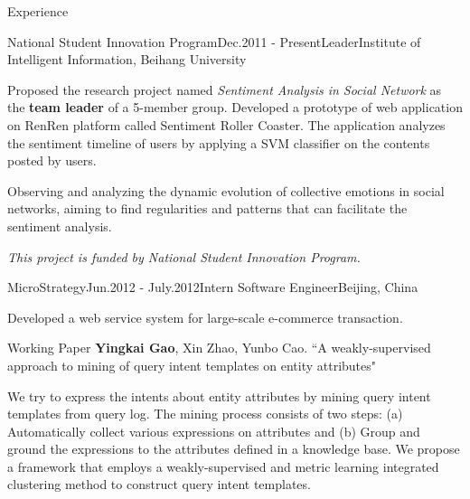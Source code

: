 \documentclass{resume} %
\begin{document}
\begin{rSection}{Experience}
\begin{rSubsection}{National Student Innovation Program}{Dec.2011 - Present}{Leader}{Institute of Intelligent Information, Beihang University}
\item Proposed the research project named \emph {Sentiment Analysis in Social Network} as the \textbf{team leader} of a 5-member group.  Developed a prototype of web application on RenRen platform called Sentiment Roller Coaster.  The application analyzes the sentiment timeline of users by applying a SVM classifier on the contents posted by users.
\item Observing and analyzing the dynamic evolution of collective emotions in social networks, aiming to find regularities and patterns that can facilitate the sentiment analysis.
\item {\em This project is funded by National Student Innovation Program.}
\end{rSubsection}


\begin{rSubsection}{MicroStrategy}{Jun.2012 - July.2012}{Intern Software Engineer}{Beijing, China}
\item Developed a web service system for large-scale e-commerce transaction.
\end{rSubsection}

\end{rSection}

\pagebreak[4]

\begin{rSection}{Working Paper}
\textbf{Yingkai Gao}, Xin Zhao, Yunbo Cao. ``A weakly-supervised approach to mining of query intent templates on entity attributes"
\begin{adjustwidth}{8pt}{0pt}
 We try to express the intents about entity attributes by mining query intent templates from query log.  The mining process consists of two steps: (a) Automatically collect various expressions on attributes and (b) Group and ground the expressions to the attributes defined in a knowledge base.  We propose a framework that employs a weakly-supervised and metric learning integrated clustering method to construct query intent templates.
\end{adjustwidth}

\end{rSection}
\end{document}
